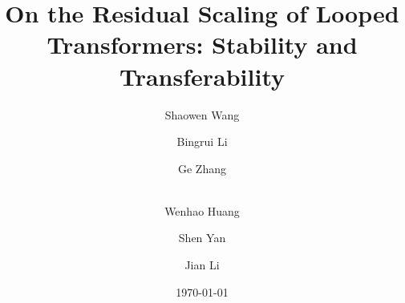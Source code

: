 \documentclass[]{bytedance_seed}
\title{On the Residual Scaling of Looped Transformers: Stability and Transferability}
\author[1,2,3]{Shaowen Wang}
\author[1,2,3]{Bingrui Li}
\author[2,3]{Ge Zhang}
\author[2]{\\Wenhao Huang}
\author[2]{Shen Yan}
\author[1]{Jian Li}
\affiliation[1]{Tsinghua University}
\affiliation[2]{ByteDance Seed}
\affiliation[3]{M-A-P}
\date{\today}
\theoremstyle{definition}
\theoremstyle{remark}
\newcommand{\seedinputappendix}{%
  \let\seedSavedAppendix\appendix
  \renewcommand{\appendix}{}%
  \let\appendix\seedSavedAppendix
}
\begin{document}
\maketitle










\clearpage



\beginappendix
\seedinputappendix
\end{document}
